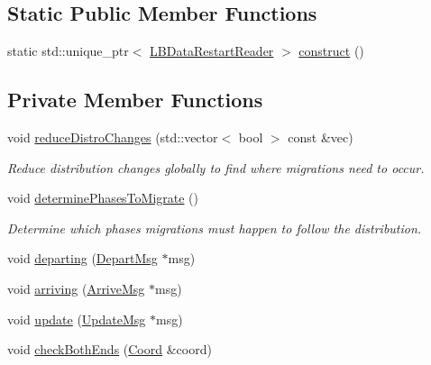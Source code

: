 \subsection*{Static Public Member Functions}
\begin{DoxyCompactItemize}
\item 
static std\+::unique\+\_\+ptr$<$ \hyperlink{structvt_1_1vrt_1_1collection_1_1balance_1_1_l_b_data_restart_reader}{L\+B\+Data\+Restart\+Reader} $>$ \hyperlink{structvt_1_1vrt_1_1collection_1_1balance_1_1_l_b_data_restart_reader_af95b01c9f94865b810acc3c1713dbeae}{construct} ()
\end{DoxyCompactItemize}
\subsection*{Private Member Functions}
\begin{DoxyCompactItemize}
\item 
void \hyperlink{structvt_1_1vrt_1_1collection_1_1balance_1_1_l_b_data_restart_reader_aa84bd50943dd33158739b78973647930}{reduce\+Distro\+Changes} (std\+::vector$<$ bool $>$ const \&vec)
\begin{DoxyCompactList}\small\item\em Reduce distribution changes globally to find where migrations need to occur. \end{DoxyCompactList}\item 
void \hyperlink{structvt_1_1vrt_1_1collection_1_1balance_1_1_l_b_data_restart_reader_af9cb0f3ba080b54902909a34f6fe0fef}{determine\+Phases\+To\+Migrate} ()
\begin{DoxyCompactList}\small\item\em Determine which phases migrations must happen to follow the distribution. \end{DoxyCompactList}\item 
void \hyperlink{structvt_1_1vrt_1_1collection_1_1balance_1_1_l_b_data_restart_reader_a307888d173e79695956a9ed6dc247c7a}{departing} (\hyperlink{structvt_1_1vrt_1_1collection_1_1balance_1_1_l_b_data_restart_reader_1_1_depart_msg}{Depart\+Msg} $\ast$msg)
\item 
void \hyperlink{structvt_1_1vrt_1_1collection_1_1balance_1_1_l_b_data_restart_reader_abbdef5a1c61003624ef5a41d281ec355}{arriving} (\hyperlink{structvt_1_1vrt_1_1collection_1_1balance_1_1_l_b_data_restart_reader_1_1_arrive_msg}{Arrive\+Msg} $\ast$msg)
\item 
void \hyperlink{structvt_1_1vrt_1_1collection_1_1balance_1_1_l_b_data_restart_reader_ae5101e7bdafbc8c6d546330b0fbadd4f}{update} (\hyperlink{structvt_1_1vrt_1_1collection_1_1balance_1_1_l_b_data_restart_reader_1_1_update_msg}{Update\+Msg} $\ast$msg)
\item 
void \hyperlink{structvt_1_1vrt_1_1collection_1_1balance_1_1_l_b_data_restart_reader_a7d8669c0396398818721febf079213c9}{check\+Both\+Ends} (\hyperlink{structvt_1_1vrt_1_1collection_1_1balance_1_1_l_b_data_restart_reader_1_1_coord}{Coord} \&coord)
\end{DoxyCompactItemize}
